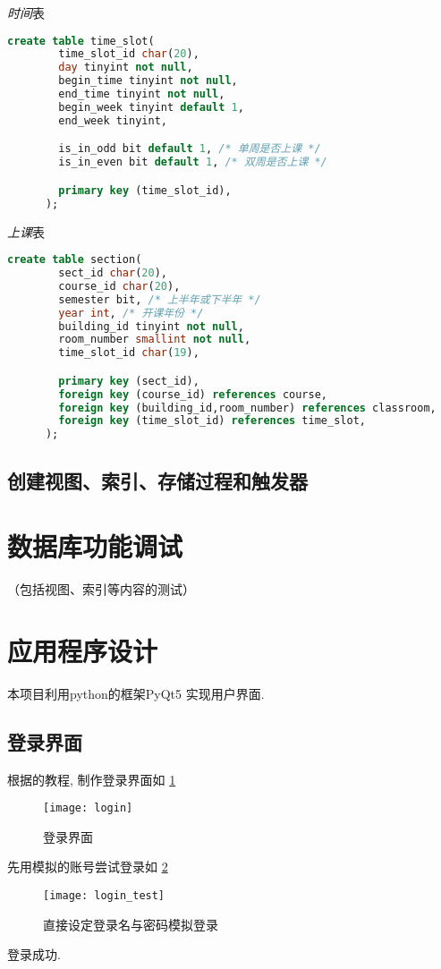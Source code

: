\documentclass{myreport}
\begin{document}
    \emph{时间}表
    \begin{lstlisting}[language=sql]
      create table time_slot(
        time_slot_id char(20),
        day tinyint not null,
        begin_time tinyint not null,
        end_time tinyint not null,
        begin_week tinyint default 1,
        end_week tinyint,

        is_in_odd bit default 1, /* 单周是否上课 */
        is_in_even bit default 1, /* 双周是否上课 */

        primary key (time_slot_id),
      );
    \end{lstlisting}

    \emph{上课}表
    \begin{lstlisting}[language=sql]
      create table section(
        sect_id char(20),
        course_id char(20),
        semester bit, /* 上半年或下半年 */
        year int, /* 开课年份 */
        building_id tinyint not null,
        room_number smallint not null,
        time_slot_id char(19),

        primary key (sect_id),
        foreign key (course_id) references course,
        foreign key (building_id,room_number) references classroom,
        foreign key (time_slot_id) references time_slot,
      );

    \end{lstlisting}

  \subsection{创建视图、索引、存储过程和触发器}




\section{数据库功能调试}
（包括视图、索引等内容的测试）

\section{应用程序设计}
  本项目利用python的框架PyQt5  实现用户界面.

  \subsection{登录界面}
    根据\cite{pyqt5_login}的教程, 制作登录界面如
    \cref{fig:login}

    \begin{figure}[H]
      \centering
      \texttt{[image: login]}
      \caption{登录界面}
      \label{fig:login}
    \end{figure}
    先用模拟的账号尝试登录如
    \cref{fig:login_test}
    \begin{figure}[H]
      \centering
      \texttt{[image: login\_test]}
      \caption{直接设定登录名与密码模拟登录}
      \label{fig:login_test}
    \end{figure}
    登录成功.
\end{document}
